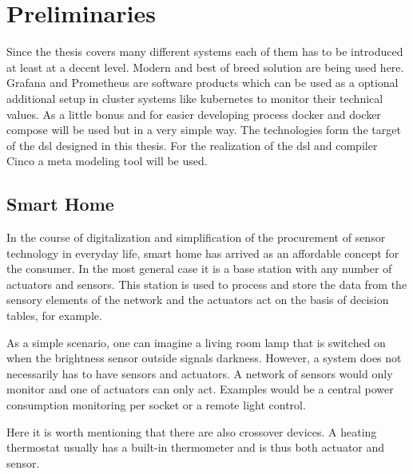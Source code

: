 \chapter{Preliminaries}
\label{chapter:grundlagen}
Since the thesis covers many different systems each of them has to be introduced at least at a decent level. Modern and best of breed solution are being used here. Grafana and Prometheus are software products which can be used as a optional additional setup in cluster systems like kubernetes to monitor their technical values. As a little bonus and for easier developing process docker and docker compose will be used but in a very simple way. The technologies form the target of the \gls{dsl} designed in this thesis. For the realization of the \gls{dsl} and compiler Cinco a meta modeling tool will be used.
 
\section{Smart Home}
In the course of digitalization and simplification of the procurement of sensor technology in everyday life, smart home has arrived as an affordable concept for the consumer. In the most general case it is a base station with any number of actuators and sensors. This station is used to process and store the data from the sensory elements of the network and the actuators act on the basis of decision tables, for example. 

As a simple scenario, one can imagine a living room lamp that is switched on when the brightness sensor outside signals darkness. However, a system does not necessarily has to have sensors and actuators. A network of sensors would only monitor and one of actuators can only act. Examples would be a central power consumption monitoring per socket or a remote light control.

Here it is worth mentioning that there are also crossover devices. A heating thermostat usually has a built-in thermometer and is thus both actuator and sensor.

